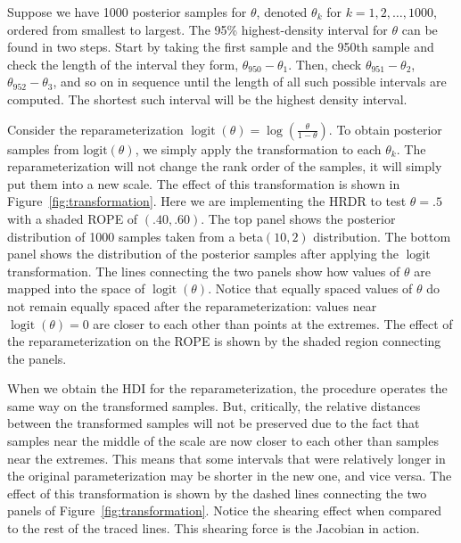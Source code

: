 \documentclass[9pt,twocolumn,twoside]{cidlab-draft}\templatetype{cidlab-invited}
\newcommand{\hdr}{HRDR}
\DeclareMathOperator*{\logit}{logit}
\begin{document}
Suppose we have 1000 posterior samples for $\theta$, denoted $\theta_k$ for $k=1,2,\dots,1000$, ordered from smallest to largest. The 95\% highest-density interval for $\theta$ can be found in two steps. Start by taking the first sample and the 950th sample and check the length of the interval they form, $\theta_{950} - \theta_1$. Then, check $\theta_{951}-\theta_2$, $\theta_{952}-\theta_3$, and so on in sequence until the length of all such possible intervals are computed. The shortest such interval will be the highest density interval. 

Consider the reparameterization $\logit(\theta)=\log\left(\frac{\theta}{1-\theta}\right)$. To obtain posterior samples from $\text{logit}(\theta)$, we simply apply the transformation to each $\theta_k$. The reparameterization will not change the rank order of the samples, it will simply put them into a new scale. The effect of this transformation is shown in Figure~\ref{fig:transformation}. Here we are implementing the \hdr{} to test $\theta=.5$ with a shaded ROPE of $(.40, .60)$. The top panel shows the posterior distribution of 1000 samples taken from a beta$(10,2)$ distribution. The bottom panel shows the distribution of the posterior samples after applying the $\logit$ transformation. The lines connecting the two panels show how values of $\theta$ are mapped into the space of $\logit(\theta)$. Notice that equally spaced values of $\theta$ do not remain equally spaced after the reparameterization: values near $\logit(\theta)=0$ are closer to each other than points at the extremes. The effect of the reparameterization on the ROPE is shown by the shaded region connecting the panels. 

When we obtain the HDI for the reparameterization, the procedure operates the same way on the transformed samples. But, critically, the relative distances between the transformed samples will not be preserved due to the fact that samples near the middle of the scale are now closer to each other than samples near the extremes. This means that some intervals that were relatively longer in the original parameterization may be shorter in the new one, and vice versa. The effect of this transformation is shown by the dashed lines connecting the two panels of Figure~\ref{fig:transformation}. Notice the shearing effect when compared to the rest of the traced lines. This shearing force is the Jacobian in action. 
\end{document}
